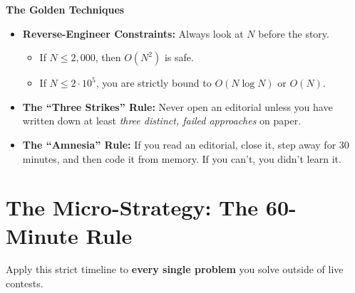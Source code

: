 \documentclass[12pt, a4paper]{article}
\begin{document}
\vspace{4pt}
\noindent\textbf{The Golden Techniques}
\begin{sidebar}
\begin{itemize}[leftmargin=1.5em, itemsep=5pt]

  \item \textbf{Reverse-Engineer Constraints:} Always look at $N$ before the
        story.
        \begin{itemize}
          \item If $N \le 2{,}000$, then $O(N^2)$ is safe.
          \item If $N \le 2 \cdot 10^5$, you are strictly bound to
                $O(N \log N)$ or $O(N)$.
        \end{itemize}

  \item \textbf{The ``Three Strikes'' Rule:} Never open an editorial unless you
        have written down at least \emph{three distinct, failed approaches} on
        paper.

  \item \textbf{The ``Amnesia'' Rule:} If you read an editorial, close it, step
        away for 30 minutes, and then code it from memory. If you can't, you
        didn't learn it.

\end{itemize}
\end{sidebar}

\section{The Micro-Strategy: The 60-Minute Rule}

Apply this strict timeline to \textbf{every single problem} you solve outside of live contests.
\end{document}
